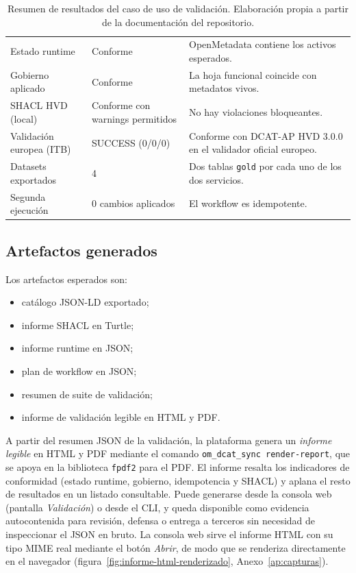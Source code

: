 \begin{table}[h]
\footnotesize
\centering
\begin{tabular}{|L{5.5cm}|L{4cm}|L{4cm}|}
\hline
{}
 &  &  \\ \hline
Estado runtime & Conforme & OpenMetadata contiene los activos esperados. \\ \hline
Gobierno aplicado & Conforme & La hoja funcional coincide con metadatos vivos. \\ \hline
SHACL HVD (local) & Conforme con warnings permitidos & No hay violaciones bloqueantes. \\ \hline
Validación europea (ITB) & SUCCESS (0/0/0) & Conforme con DCAT-AP HVD 3.0.0 en el validador oficial europeo. \\ \hline
Datasets exportados & 4 & Dos tablas \texttt{gold} por cada uno de los dos servicios. \\ \hline
Segunda ejecución & 0 cambios aplicados & El workflow es idempotente. \\ \hline
\end{tabular}
\caption{Resumen de resultados del caso de uso de validación. Elaboración propia a partir de la documentación del repositorio.}
\label{tab:resultados}
\end{table}

\subsection{Artefactos generados}

Los artefactos esperados son:

\begin{itemize}
  \item catálogo JSON-LD exportado;
  \item informe SHACL en Turtle;
  \item informe runtime en JSON;
  \item plan de workflow en JSON;
  \item resumen de suite de validación;
  \item informe de validación legible en HTML y PDF.
\end{itemize}

A partir del resumen JSON de la validación, la plataforma genera un \emph{informe legible} en HTML y PDF mediante el comando \texttt{om\_dcat\_sync render-report}, que se apoya en la biblioteca \texttt{fpdf2} para el PDF. El informe resalta los indicadores de conformidad (estado runtime, gobierno, idempotencia y \ac{SHACL}) y aplana el resto de resultados en un listado consultable. Puede generarse desde la consola web (pantalla \emph{Validación}) o desde el \ac{CLI}, y queda disponible como evidencia autocontenida para revisión, defensa o entrega a terceros sin necesidad de inspeccionar el \ac{JSON} en bruto. La consola web sirve el informe HTML con su tipo \ac{MIME} real mediante el botón \emph{Abrir}, de modo que se renderiza directamente en el navegador (figura~\ref{fig:informe-html-renderizado}, Anexo~\ref{ap:capturas}).

